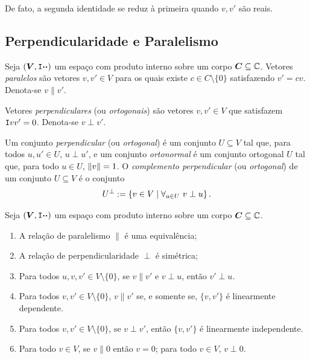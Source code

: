 De fato, a segunda identidade se reduz à primeira quando $v,v'$ são reais.	

\subsection{Perpendicularidade e Paralelismo}

\begin{defi}
Seja $(\bm V,\mathtt I{\bm{\cdot}}{\bm{\cdot}})$ um espaço com produto interno sobre um corpo $\bm C \subseteq \mathbb{C}$. Vetores \emph{paralelos} são vetores $v,v' \in V$ para os quais existe $c \in C \setminus \{0\}$ satisfazendo $v'=cv$. Denota-se $v \parallel v'$.

Vetores \emph{perpendiculares} (ou \emph{ortogonais}) são vetores $v,v' \in V$ que satisfazem $\mathtt I{v}{v'}=0$. Denota-se $v \perp v'$.

Um conjunto \emph{perpendicular} (ou \emph{ortogonal}) é um conjunto $U \subseteq V$ tal que, para todos $u,u' \in U$, $u \perp u'$, e um conjunto \emph{ortonormal} é um conjunto ortogonal $U$ tal que, para todo $u \in U$, $\left\Vert{v}\right\Vert=1$. O \emph{complemento perpendicular} (ou \emph{ortogonal}) de um conjunto $U \subseteq V$ é o conjunto
	\begin{equation*}
	U^\perp := \left\{v \in V \;\middle\vert\; \forall_{u \in U}\ v \perp u \right\}.
	\end{equation*}
\end{defi}

\begin{prop}
Seja $(\bm V,\mathtt I{\bm{\cdot}}{\bm{\cdot}})$ um espaço com produto interno sobre um corpo $\bm C \subseteq \mathbb{C}$.
	\begin{enumerate}
	\item A relação de paralelismo $\parallel$ é uma equivalência;
	\item A relação de perpendicularidade $\perp$ é simétrica;
	\item Para todos $u,v,v' \in V \setminus \{0\}$, se $v \parallel v'$ e $v \perp u$, então $v' \perp u$.
	\item Para todos $v,v' \in V \setminus \{0\}$, $v \parallel v'$ se, e somente se, $\{v,v'\}$ é linearmente dependente.
	\item Para todos $v,v' \in V \setminus \{0\}$, se $v \perp v'$, então $\{v,v'\}$ é linearmente independente.
	\item Para todo $v \in V$, se $v \parallel 0$ então $v=0$; para todo $v \in V$, $v \perp 0$.
	\end{enumerate}
\end{prop}

